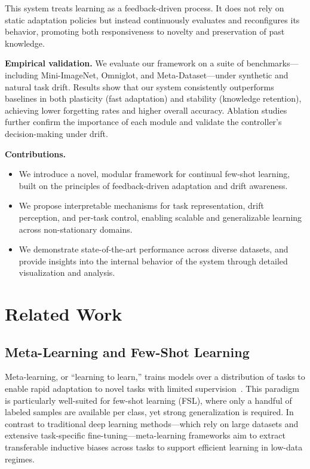 \documentclass[conference]{IEEEtran}
\begin{document}
This system treats learning as a feedback-driven process. It does not rely on static adaptation policies but instead continuously evaluates and reconfigures its behavior, promoting both responsiveness to novelty and preservation of past knowledge.

\vspace{0.5em}
\noindent\textbf{Empirical validation.}  
We evaluate our framework on a suite of benchmarks—including Mini-ImageNet, Omniglot, and Meta-Dataset—under synthetic and natural task drift. Results show that our system consistently outperforms baselines in both plasticity (fast adaptation) and stability (knowledge retention), achieving lower forgetting rates and higher overall accuracy. Ablation studies further confirm the importance of each module and validate the controller’s decision-making under drift.

\vspace{0.5em}
\noindent\textbf{Contributions.}
\begin{itemize}
    \item We introduce a novel, modular framework for continual few-shot learning, built on the principles of feedback-driven adaptation and drift awareness.
    \item We propose interpretable mechanisms for task representation, drift perception, and per-task control, enabling scalable and generalizable learning across non-stationary domains.
    \item We demonstrate state-of-the-art performance across diverse datasets, and provide insights into the internal behavior of the system through detailed visualization and analysis.
\end{itemize}





\section{Related Work}

\subsection{Meta-Learning and Few-Shot Learning}

Meta-learning, or ``learning to learn,'' trains models over a distribution of tasks to enable rapid adaptation to novel tasks with limited supervision~\cite{schmidhuber1987}. This paradigm is particularly well-suited for few-shot learning (FSL), where only a handful of labeled samples are available per class, yet strong generalization is required. In contrast to traditional deep learning methods—which rely on large datasets and extensive task-specific fine-tuning—meta-learning frameworks aim to extract transferable inductive biases across tasks to support efficient learning in low-data regimes.
\end{document}
